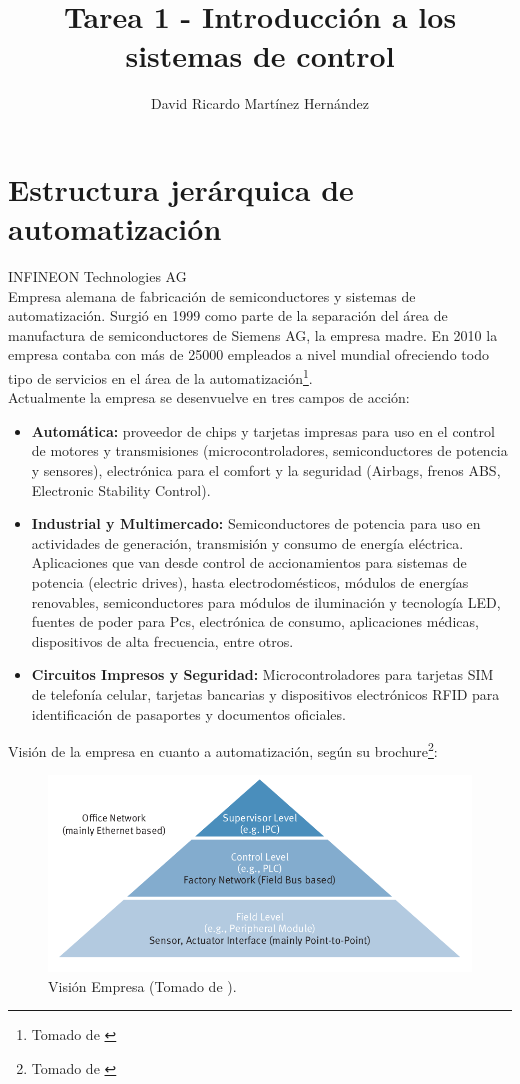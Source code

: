 \documentclass[10pt,graphicx,caption,rotating]{article}
\title{Tarea 1 - Introducción a los sistemas de control}
\author{David Ricardo Martínez Hernández}
\date{}
\begin{document}
\maketitle

\section{Estructura jerárquica de automatización}
\noindent
INFINEON Technologies AG\\
\noindent
Empresa alemana de fabricación de semiconductores y sistemas de automatización. Surgió en 1999 como parte de la separación del área de manufactura de semiconductores de Siemens AG, la empresa madre. En 2010 la empresa contaba con más de 25000 empleados a nivel mundial ofreciendo todo tipo de servicios en el área de la automatización\footnote{Tomado de \cite{page1}}.\\
Actualmente la empresa se desenvuelve en tres campos de acción:
\begin{itemize}
  \item \textbf{Automática:} proveedor de chips y tarjetas impresas para uso en el control de motores y transmisiones (microcontroladores, semiconductores de potencia y sensores), electrónica para el comfort y la seguridad (Airbags, frenos ABS, Electronic Stability Control).
  \item \textbf{Industrial y Multimercado:} Semiconductores de potencia para uso en actividades de generación, transmisión y consumo de energía eléctrica. Aplicaciones que van desde control de accionamientos para sistemas de potencia (electric drives), hasta electrodomésticos, módulos de energías renovables, semiconductores para módulos de iluminación y tecnología LED, fuentes de poder para Pcs, electrónica de consumo, aplicaciones médicas, dispositivos de alta frecuencia, entre otros.
  \item \textbf{Circuitos Impresos y Seguridad:} Microcontroladores para tarjetas SIM de telefonía celular, tarjetas bancarias y dispositivos electrónicos RFID para identificación de pasaportes y documentos oficiales.
\end{itemize}
Visión de la empresa en cuanto a automatización, según su brochure\footnote{Tomado de \cite{page2}}:
\begin{figure}[H]
	\centering
		\includegraphics[scale=0.5]{image1.png}
	\caption{Visión Empresa (Tomado de \cite{page2}).}
	\label{fig1}
\end{figure}
\end{document}
